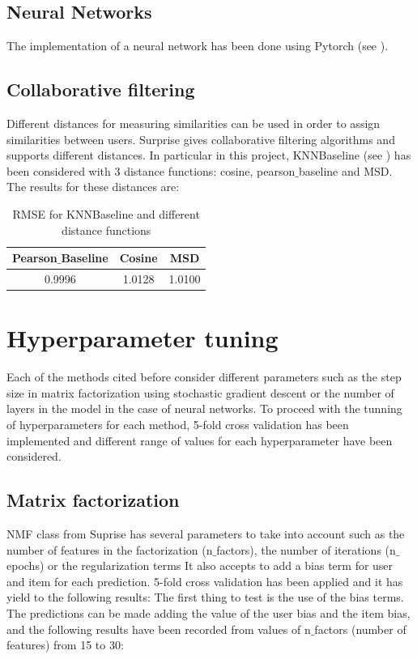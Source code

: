 \documentclass[11pt,conference]{IEEEtran}
\begin{document}
\subsection{Neural Networks}
The implementation of a neural network has been done using Pytorch (see \cite{Pytorch}).  

\subsection{Collaborative filtering}  %
Different distances for measuring similarities can be used in order to assign similarities between users. Surprise gives collaborative filtering algorithms and supports different distances. In particular in this project, KNNBaseline (see \cite{KNNBaseline}) has been considered with 3 distance functions: cosine, pearson$\_$baseline and MSD. The results for these distances are:
\\

\begin{table}[htbp]
\begin{center}
\begin{tabular}{|c|c|c|}
\hline
Pearson$\_$Baseline& Cosine & MSD \\
\hline 
0.9996 & 1.0128 & 1.0100  \\ \hline
\end{tabular}
\end{center}
\caption{RMSE for KNNBaseline and different distance functions}
\end{table}

\section{Hyperparameter tuning}
Each of the methods cited before consider different parameters such as the step size in matrix factorization using stochastic gradient descent or the number of layers in the model in the case of neural networks. To proceed with the tunning of hyperparameters for each method, 5-fold cross validation has been implemented and different range of values for each hyperparameter have been considered. 
\subsection{Matrix factorization}
NMF class from Suprise has several parameters to take into account such as the number of features in the factorization (n$\_$factors), the number of iterations (n$\_$epochs) or the regularization terms %
It also accepts to add a bias term for user and item for each prediction. 
5-fold cross validation has been applied and it has yield to the following results:
The first thing to test is the use of the bias terms. The predictions can be made adding the value of the user bias and the item bias, and the following results have been recorded from values of n$\_$factors (number of features) from 15 to 30:
\end{document}
